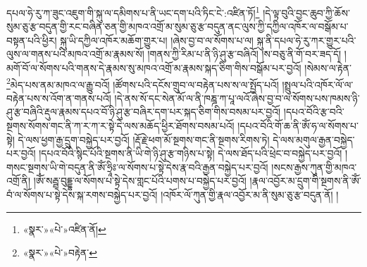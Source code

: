 དཔལ་ཧེ་རུ་ཀ་ཟུང་འཇུག་གི་སྐུ་ལ་དམིགས་པ་ནི་ཡང་དག་པའི་ཏིང་ངེ་:འཛིན་ཏོ།\footnote{«སྣར་»«པེ་»འཛིན་ནོ།} །དེ་ལྟ་བུའི་བྱང་ཆུབ་ཀྱི་ཆོས་སུམ་ཅུ་རྩ་བདུན་གྱི་རང་བཞིན་ཅན་གྱི་མཁའ་འགྲོ་མ་སུམ་ཅུ་རྩ་བདུན་ནང་ལུས་ཀྱི་དཀྱིལ་འཁོར་ལ་བསྒོམ་པ་བསྟན་པའི་ཕྱིར། སྐུ་ཡི་དཀྱིལ་འཁོར་མཆོག་གྱུར་པ། །ཞེས་བྱ་བ་ལ་སོགས་པ་ལ། སྐུ་ནི་དཔལ་ཧེ་རུ་ཀར་གྱུར་པའི་ལུས་ལ་གནས་པའི་མཁའ་འགྲོ་མ་རྣམས་སོ། །གནས་ཀྱི་རིམ་པ་ནི་ཉི་ཤུ་རྩ་བཞིའོ། །ས་བཅུ་ནི་གོ་བར་ཟད་དོ། །མགོ་བོ་ལ་སོགས་པའི་གནས་དེ་རྣམས་སུ་མཁའ་འགྲོ་མ་རྣམས་སྐད་ཅིག་གིས་བསྒོམ་པར་བྱའོ། །སེམས་ལ་རྟེན་\footnote{«སྣར་»«པེ་»བརྟེན་}མེད་པས་ནམ་མཁའ་ལ་རྒྱུ་བའོ། །ཚོགས་པའི་དངོས་གྲུབ་ལ་བརྟེན་པས་ས་ལ་སྤྱོད་པའོ། །སྤྲུལ་པའི་འཁོར་ལོ་ལ་བརྟེན་པས་ས་འོག་ན་གནས་པའོ། །དེ་ནས་སོ་དང་སེན་མོ་ལ་ནི་ཁཎྜ་ཀ་པཱ་ལའོ་ཞེས་བྱ་བ་ལ་སོགས་པས་ཁམས་ཉི་ཤུ་རྩ་བཞིའི་རྡུལ་རྣམས་དཔའ་བོ་ཉི་ཤུ་རྩ་བཞིར་དག་པར་སྐད་ཅིག་གིས་བསམ་པར་བྱའོ། །དཔའ་བོའི་རྩ་བའི་སྔགས་སོགས་གང་ནི་ཀ་ར་ཀ་ར་སྟེ་དེ་ལས་མཆོད་ཕྱིར་ཐོགས་བསམ་པའོ། །དཔའ་བོའི་གོ་ཆ་ནི་ཨོཾ་ཧ་ལ་སོགས་པ་སྟེ། དེ་ལས་ཕྱག་རྒྱ་དྲུག་བསྐྱེད་པར་བྱའོ། །རྡོ་རྗེ་ཕག་མོ་སྔགས་གང་ནི་སྔགས་རིགས་ཏེ། དེ་ལས་མགུལ་རྒྱན་བསྐྱེད་པར་བྱའོ། །དཔའ་བོའི་སྙིང་པོའི་སྔགས་ནི་ཡི་གེ་ཉི་ཤུ་རྩ་གཉིས་པ་སྟེ། དེ་ལས་ཐོད་པའི་ཕྲེང་བ་བསྐྱེད་པར་བྱའོ། །གསང་སྔགས་ཡི་གེ་བདུན་ནི་ཨོཾ་ཧྲཱིཿ་ལ་སོགས་པ་སྟེ་དེས་རྣ་བའི་རྒྱན་བསྐྱེད་པར་བྱའོ། །སངས་རྒྱས་ཀུན་གྱི་མཁའ་འགྲོ་ནི། །ཨོཾ་སརྦྦ་བུདྡྷ་ལ་སོགས་པ་སྟེ་དེས་གླང་པོའི་པགས་པ་བསྐྱེད་པར་བྱའོ། །རྣལ་འབྱོར་མ་དྲུག་གི་སྔགས་ནི་ཨོཾ་བཾ་ལ་སོགས་པ་སྟེ་དེས་སྐ་རགས་བསྐྱེད་པར་བྱའོ། །འཁོར་ལོ་ཀུན་གྱི་རྣལ་འབྱོར་མ་ནི་སུམ་ཅུ་རྩ་བདུན་ནོ། །
